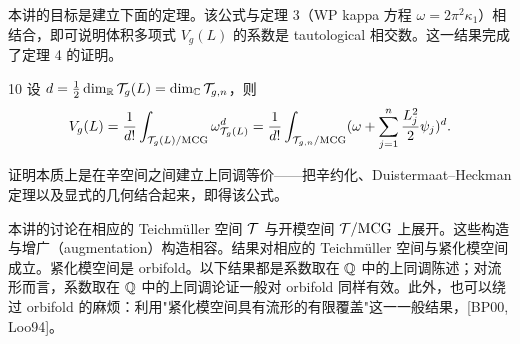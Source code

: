 
本讲的目标是建立下面的定理。该公式与定理 3（WP kappa 方程 $\omega=2\pi^2\kappa_1$）相结合，即可说明体积多项式 $V_g(L)$ 的系数是 tautological 相交数。这一结果完成了定理 4 的证明。

\begin{thm}{10} 设 $d=\frac{1}{2}\dim_{\mathbb{R}}\mathcal{T}_g(L)=\dim_{\mathbb{C}}\mathcal{T}_{g,n}$，则
\[
V_g(L)=\frac{1}{d!}\int_{\mathcal{T}_g(L)/\mathrm{MCG}}\omega^d_{\mathcal{T}_g(L)}
=\frac{1}{d!}\int_{\mathcal{T}_{g,n}/\mathrm{MCG}}(\omega+\sum_{j=1}^n\frac{L_j^2}{2}\psi_j)^d.
\]
\end{thm}

证明本质上是在辛空间之间建立上同调等价——把辛约化、Duistermaat--Heckman 定理以及显式的几何结合起来，即得该公式。

本讲的讨论在相应的 Teichmüller 空间 $\mathcal{T}$ 与开模空间 $\mathcal{T}/\mathrm{MCG}$ 上展开。这些构造与增广（augmentation）构造相容。结果对相应的 Teichmüller 空间与紧化模空间成立。紧化模空间是 orbifold。以下结果都是系数取在 $\mathbb{Q}$ 中的上同调陈述；对流形而言，系数取在 $\mathbb{Q}$ 中的上同调论证一般对 orbifold 同样有效。此外，也可以绕过 orbifold 的麻烦：利用"紧化模空间具有流形的有限覆盖"这一一般结果，[BP00, Loo94]。


